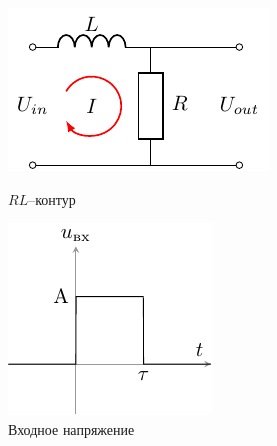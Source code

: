 
\begin{figure}[h!]
\centering
\begin{minipage}{0.4\textwidth}
\centering
\includegraphics[width=\linewidth]{chem/task2}
\caption{$RL$--контур}
\label{fig:2figsA}
\end{minipage}
\qquad
\begin{minipage}{0.4\textwidth}
\centering
\includegraphics[width=\linewidth]{ris/task2_input}
\caption{Входное напряжение}
\label{fig:2figsB}
\end{minipage}
\end{figure}

